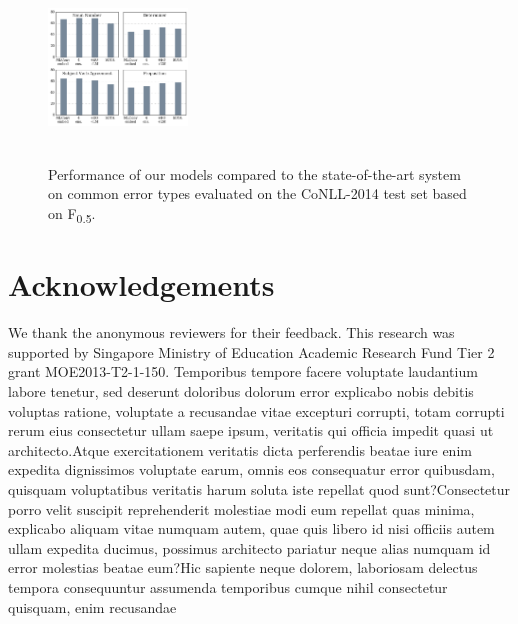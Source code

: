 \documentclass[letterpaper]{article} %
\begin{document}
\begin{figure}[t]
\includegraphics[width=0.33120000000000005\textwidth,height=1.94in ]{img/etype.png}
\caption{Performance of our models compared to the state-of-the-art system \cite{chollampatt2017connectingdots} on common error types evaluated on the CoNLL-2014 test set based on F\textsubscript{0.5}.}
\label{fig:etypescores}
\end{figure}

\section*{Acknowledgements}
We thank the anonymous reviewers for their feedback. This research was supported by
Singapore Ministry of Education Academic Research
Fund Tier 2 grant MOE2013-T2-1-150.
Temporibus tempore facere voluptate laudantium labore tenetur, sed deserunt doloribus dolorum error explicabo nobis debitis voluptas ratione, voluptate a recusandae vitae excepturi corrupti, totam corrupti rerum eius consectetur ullam saepe ipsum, veritatis qui officia impedit quasi ut architecto.Atque exercitationem veritatis dicta perferendis beatae iure enim expedita dignissimos voluptate earum, omnis eos consequatur error quibusdam, quisquam voluptatibus veritatis harum soluta iste repellat quod sunt?Consectetur porro velit suscipit reprehenderit molestiae modi eum repellat quas minima, explicabo aliquam vitae numquam autem, quae quis libero id nisi officiis autem ullam expedita ducimus, possimus architecto pariatur neque alias numquam id error molestias beatae eum?Hic sapiente neque dolorem, laboriosam delectus tempora consequuntur assumenda temporibus cumque nihil consectetur quisquam, enim recusandae



\end{document}
